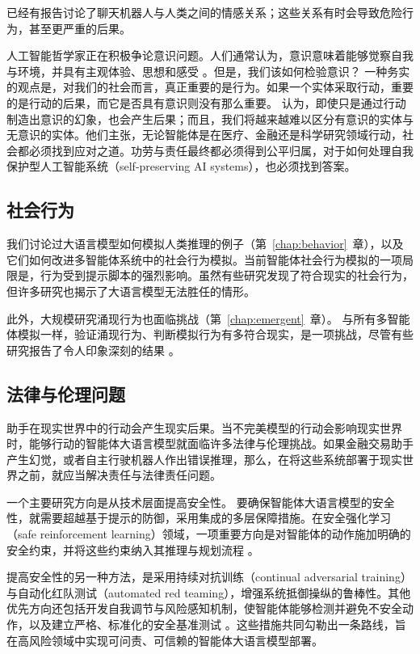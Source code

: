 已经有报告讨论了聊天机器人与人类之间的情感关系；这些关系有时会导致危险行为，甚至更严重的后果。

人工智能哲学家正在积极争论意识问题。人们通常认为，意识意味着能够觉察自我与环境，并具有主观体验、思想和感受 \citep{velmans2009understanding,butlin2023consciousness}。但是，我们该如何检验意识？
一种务实的观点是，对我们的社会而言，真正重要的是行为。如果一个实体采取行动，重要的是行动的后果，而它是否具有意识则没有那么重要。\citet{bengio2025illusions} 认为，即使只是通过行动制造出意识的幻象，也会产生后果；而且，我们将越来越难以区分有意识的实体与无意识的实体。他们主张，无论智能体是在医疗、金融还是科学研究领域行动，社会都必须找到应对之道。功劳与责任最终都必须得到公平归属，对于如何处理自我保护型人工智能系统（self-preserving AI systems），也必须找到答案。

\subsection{社会行为}
我们讨论过大语言模型如何模拟人类推理的例子（第~\ref{chap:behavior}~章），以及它们如何改进多智能体系统中的社会行为模拟。当前智能体社会行为模拟的一项局限是，行为受到提示脚本的强烈影响。虽然有些研究发现了符合现实的社会行为，但许多研究也揭示了大语言模型无法胜任的情形。

此外，大规模研究涌现行为也面临挑战（第~\ref{chap:emergent}~章）。
与所有多智能体模拟一样，验证涌现行为、判断模拟行为有多符合现实，是一项挑战，尽管有些研究报告了令人印象深刻的结果 \citep{park2024generative}。

\subsection{法律与伦理问题}
助手在现实世界中的行动会产生现实后果。当不完美模型的行动会影响现实世界时，能够行动的智能体大语言模型就面临许多法律与伦理挑战。如果金融交易助手产生幻觉，或者自主行驶机器人作出错误推理，那么，在将这些系统部署于现实世界之前，就应当解决责任与法律责任问题。


一个主要研究方向是从技术层面提高安全性。
要确保智能体大语言模型的安全性，就需要超越基于提示的防御，采用集成的多层保障措施。在安全强化学习（safe reinforcement learning）领域，一项重要方向是对智能体的动作施加明确的安全约束，并将这些约束纳入其推理与规划流程 \citep{gu2024review}。

提高安全性的另一种方法，是采用持续对抗训练（continual adversarial training）与自动化红队测试（automated red teaming），增强系统抵御操纵的鲁棒性。其他优先方向还包括开发自我调节与风险感知机制，使智能体能够检测并避免不安全动作，以及建立严格、标准化的安全基准测试 \citep{andriushchenko2024agentharm}。这些措施共同勾勒出一条路线，旨在高风险领域中实现可问责、可信赖的智能体大语言模型部署。

